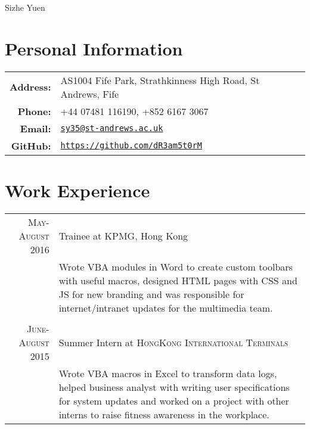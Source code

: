 \documentclass{article}
\begin{document}
\pagestyle{empty} %


\par{\centering
		{\Huge Sizhe Yuen
	}\bigskip\par}

\section*{Personal Information}

\begin{tabular}{rl}
    \textbf{Address:}   & AS1004 Fife Park, Strathkinness High Road, St Andrews, Fife \\
    \textbf{Phone:}     & +44 07481 116190, +852 6167 3067 \\
    \textbf{Email:}     & \texttt{\href{mailto:sy35@st-andrews.ac.uk}{sy35@st-andrews.ac.uk}} \\
    \textbf{GitHub:}    & \texttt{\href{https://github.com/dR3am5t0rM}{https://github.com/dR3am5t0rM}}
\end{tabular}

\section*{Work Experience}
\begin{tabular}{r|p{15cm}}

\textsc{May-August 2016} & Trainee at \textsc{KPMG}, Hong Kong \\
 
&\footnotesize{Wrote VBA modules in Word to create custom toolbars with useful macros, designed HTML pages with CSS and JS for new branding and was responsible for internet/intranet updates for the multimedia team.}\\\multicolumn{2}{c}{} \\


\textsc{June-August 2015} & Summer Intern at \textsc{HongKong International Terminals} \\

&\footnotesize{Wrote VBA macros in Excel to transform data logs, helped business analyst with writing user specifications for system updates and worked on a project with other interns to raise fitness awareness in the workplace.}\\
\end{tabular}
\end{document}

